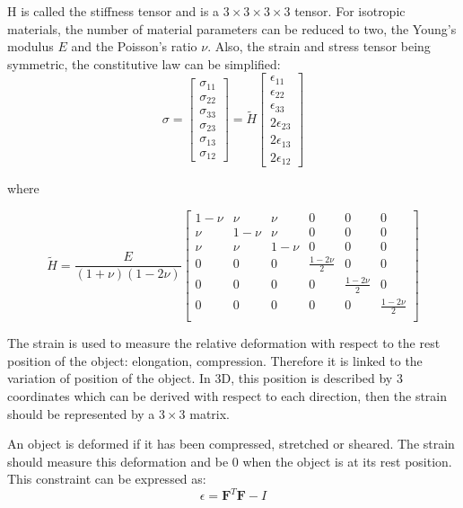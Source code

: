 H is called the stiffness tensor and is a $3\times3\times3\times3$ tensor. For isotropic materials, the number of material parameters can be reduced to two, the Young's modulus $E$ and the Poisson's ratio $\nu$. Also, the strain and stress tensor being symmetric, the constitutive law can be simplified:
\begin{equation}
\sigma = 
\begin{bmatrix}
\sigma_{11} \\
\sigma_{22} \\
\sigma_{33} \\
\sigma_{23} \\
\sigma_{13} \\
\sigma_{12}
\end{bmatrix}
=
\tilde{H}
\begin{bmatrix}
\epsilon_{11} \\
\epsilon_{22} \\
\epsilon_{33} \\
2\epsilon_{23} \\
2\epsilon_{13} \\
2\epsilon_{12}
\end{bmatrix}
\end{equation}

where

\begin{equation}
\tilde{H} =
\frac{E}{\left(1+\nu\right)\left(1-2\nu\right)}
\begin{bmatrix}
1-\nu & \nu & \nu & 0 & 0 & 0 \\ 
\nu & 1-\nu & \nu & 0 & 0 & 0 \\
\nu & \nu & 1-\nu & 0 & 0 & 0 \\
0 & 0 & 0 & \frac{1-2\nu}{2} & 0 & 0 \\
0 & 0 & 0 & 0 & \frac{1-2\nu}{2} & 0 \\
0 & 0 & 0 & 0 & 0 & \frac{1-2\nu}{2} \\
\end{bmatrix}
\end{equation}

The strain is used to measure the relative deformation with respect to the rest position of the object: elongation, compression. Therefore it is  linked to the variation of position of the object. In 3D, this position is described by 3 coordinates which can be derived with respect to each direction, then the strain should be represented by a $3\times3$ matrix.

An object is deformed if it has been compressed, stretched or sheared. The strain should measure this deformation and be $0$ when the object is at its rest position. This constraint can be expressed as:
\begin{equation}
\epsilon = \mathbf{F}^{T}\mathbf{F}-I
\end{equation}

